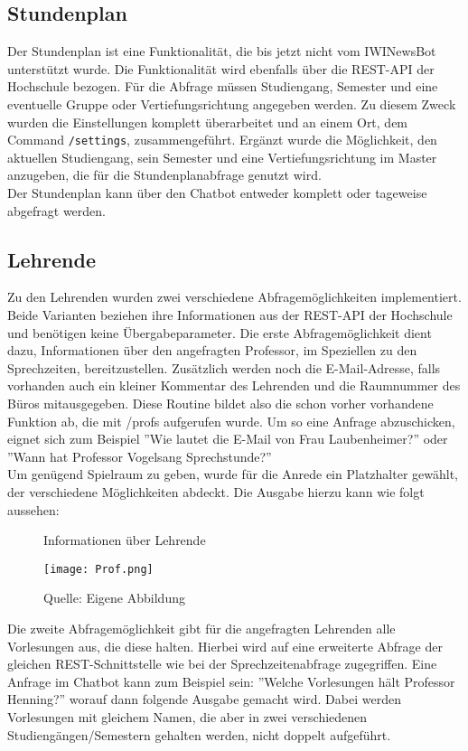 \subsection{Stundenplan}
Der Stundenplan ist eine Funktionalität, die bis jetzt nicht vom IWINewsBot unterstützt wurde. Die Funktionalität wird ebenfalls über die REST-API der Hochschule bezogen. Für die Abfrage müssen Studiengang, Semester und eine eventuelle Gruppe oder Vertiefungsrichtung angegeben werden. Zu diesem Zweck wurden die Einstellungen komplett überarbeitet und an einem Ort, dem Command \texttt{/settings}, zusammengeführt. Ergänzt wurde die Möglichkeit, den aktuellen Studiengang, sein Semester und eine Vertiefungsrichtung im Master anzugeben, die für die Stundenplanabfrage genutzt wird. \\
Der Stundenplan kann über den Chatbot entweder komplett oder tageweise abgefragt werden.


\subsection{Lehrende}
Zu den Lehrenden wurden zwei verschiedene Abfragemöglichkeiten implementiert. Beide Varianten beziehen ihre Informationen aus der REST-API der Hochschule und benötigen keine Übergabeparameter. 
Die erste Abfragemöglichkeit dient dazu, Informationen über den angefragten Professor, im Speziellen zu den Sprechzeiten, bereitzustellen. Zusätzlich werden noch die E-Mail-Adresse, falls vorhanden auch ein kleiner Kommentar des Lehrenden und die Raumnummer des Büros mitausgegeben. Diese Routine bildet also die schon vorher vorhandene Funktion ab, die mit /profs aufgerufen wurde. Um so eine Anfrage abzuschicken, eignet sich zum Beispiel ''Wie lautet die E-Mail von Frau Laubenheimer?'' oder ''Wann hat Professor Vogelsang Sprechstunde?'' \\
Um genügend Spielraum zu geben, wurde für die Anrede ein Platzhalter gewählt, der verschiedene Möglichkeiten abdeckt. Die Ausgabe hierzu kann wie folgt aussehen:

\begin{figure}[!htb]
    \centering
    \caption{Informationen über Lehrende}
      \texttt{[image: Prof.png]}
      \label{img:profuebersicht}
    \caption*{Quelle: Eigene Abbildung}
\end{figure}

Die zweite Abfragemöglichkeit gibt für die angefragten Lehrenden alle Vorlesungen aus, die diese halten. Hierbei wird auf eine erweiterte Abfrage der gleichen REST-Schnittstelle wie bei der Sprechzeitenabfrage zugegriffen. Eine Anfrage im Chatbot kann zum Beispiel sein: ''Welche Vorlesungen hält Professor Henning?'' worauf dann folgende Ausgabe gemacht wird. Dabei werden Vorlesungen mit gleichem Namen, die aber in zwei verschiedenen Studiengängen/Semestern gehalten werden, nicht doppelt aufgeführt.

